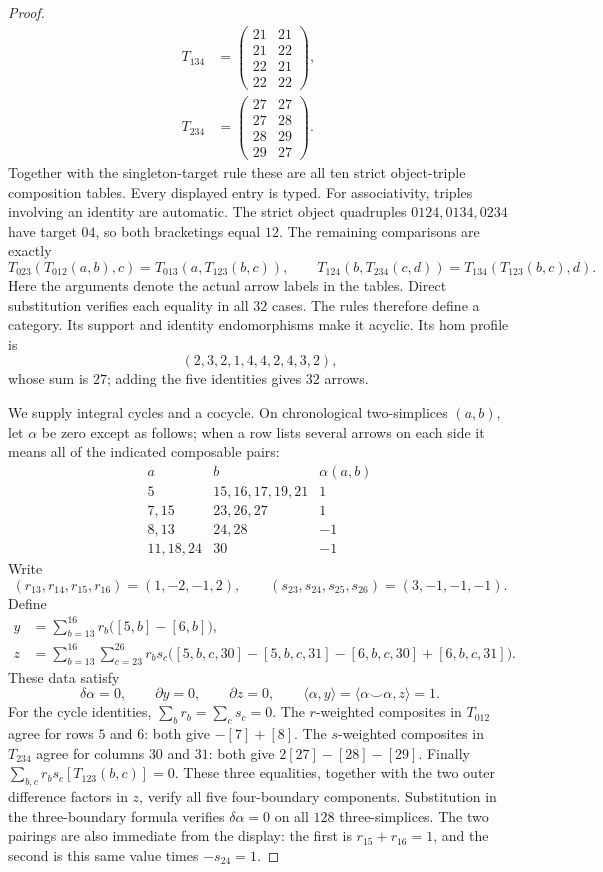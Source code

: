 \begin{proof}
\[\begin{aligned}
T_{134}&=\begin{pmatrix}21&21\\21&22\\22&21\\22&22\end{pmatrix},\\[3pt]
T_{234}&=\begin{pmatrix}27&27\\27&28\\28&29\\29&27\end{pmatrix}.&&
\end{aligned}
\]
Together with the singleton-target rule these are all ten strict
object-triple composition tables. Every displayed entry is typed.
For associativity, triples involving an identity are automatic.
The strict object quadruples $0124,0134,0234$ have target $04$,
so both bracketings equal $12$. The remaining comparisons are
exactly
\[
 T_{023}(T_{012}(a,b),c)
   =T_{013}(a,T_{123}(b,c)),\qquad
 T_{124}(b,T_{234}(c,d))
   =T_{134}(T_{123}(b,c),d).
\]
Here the arguments denote the actual arrow labels in the tables.
Direct substitution verifies each equality in all $32$ cases.
The rules therefore define a category. Its support and identity
endomorphisms make it acyclic. Its hom profile is
\[
 (2,3,2,1,4,4,2,4,3,2),
\]
whose sum is $27$; adding the five identities gives $32$ arrows.

We supply integral cycles and a cocycle. On chronological
two-simplices $(a,b)$, let $\alpha$ be zero except as follows;
when a row lists several arrows on each side it means all of
the indicated composable pairs:
\[
\begin{array}{c|l|r}
a&b&\alpha(a,b)\\\hline
5&15,16,17,19,21&1\\
7,15&23,26,27&1\\
8,13&24,28&-1\\
11,18,24&30&-1
\end{array}
\]
Write
\[
 (r_{13},r_{14},r_{15},r_{16})=(1,-2,-1,2),\qquad
 (s_{23},s_{24},s_{25},s_{26})=(3,-1,-1,-1).
\]
Define
\[
\begin{split}
y&=\sum_{b=13}^{16}r_b\bigl([5,b]-[6,b]\bigr),\\
z&=\sum_{b=13}^{16}\sum_{c=23}^{26}r_b s_c
 \bigl([5,b,c,30]-[5,b,c,31]
       -[6,b,c,30]+[6,b,c,31]\bigr).
\end{split}
\]
These data satisfy
\[
 \delta\alpha=0,\qquad \partial y=0,\qquad \partial z=0,
 \qquad \langle\alpha,y\rangle
       =\langle\alpha\smile\alpha,z\rangle=1.
\]
For the cycle identities, $\sum_b r_b=\sum_c s_c=0$.
The $r$-weighted composites in $T_{012}$ agree for rows $5$ and
$6$: both give $-[7]+[8]$. The $s$-weighted composites in
$T_{234}$ agree for columns $30$ and $31$: both give
$2[27]-[28]-[29]$. Finally
$\sum_{b,c}r_bs_c[T_{123}(b,c)]=0$. These three equalities,
together with the two outer difference factors in $z$, verify
all five four-boundary components. Substitution in the
three-boundary formula verifies $\delta\alpha=0$ on all $128$
three-simplices. The two pairings are also immediate from the
display: the first is $r_{15}+r_{16}=1$, and the second is this
same value times $-s_{24}=1$.


\end{proof}
